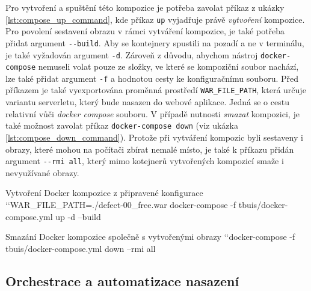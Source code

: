 \documentclass[czech, ma, kiv, he, iso690alph, pdf, viewonly]{fasthesis}
\begin{document}
    Pro vytvoření a spuštění této kompozice je potřeba zavolat příkaz z ukázky \ref{lst:compose_up_command}, kde příkaz \verb|up| vyjadřuje právě \textit{vytvoření} kompozice. Pro povolení sestavení obrazu v rámci vytváření kompozice, je také potřeba přidat argument \verb|--build|. Aby se kontejnery spustili na pozadí a ne v terminálu, je také vyžadován argument \verb|-d|. Zároveň z důvodu, abychom nástroj \verb|docker-compose| nemuseli volat pouze ze složky, ve které se kompoziční soubor nachází, lze také přidat argument \verb|-f| a hodnotou cesty ke konfiguračnímu souboru. Před příkazem je také vyexportována proměnná prostředí \verb|WAR_FILE_PATH|, která určuje variantu serverletu, který bude nasazen do webové aplikace. Jedná se o cestu relativní vůči \textit{docker compose} souboru. V případě nutnosti \textit{smazat} kompozici, je také možnost zavolat příkaz \verb|docker-compose down| (viz ukázka \ref{lst:compose_down_command}). Protože při vytváření kompozic byli sestaveny i obrazy, které mohou na počítači zbírat nemalé místo, je také k příkazu přidán argument \verb|--rmi all|, který mimo kotejnerů vytvořených kompozicí smaže i nevyužívané obrazy.

    \begin{console}{Vytvoření Docker kompozice z připravené konfigurace \label{lst:compose_up_command}}
`\uxprompt`WAR_FILE_PATH=./defect-00_free.war docker-compose -f tbuis/docker-compose.yml up -d --build
    \end{console}

    \begin{console}{Smazání Docker kompozice společně s vytvořenými obrazy \label{lst:compose_down_command}}
`\uxprompt`docker-compose -f tbuis/docker-compose.yml down --rmi all
    \end{console}

    \subsection{Orchestrace a automatizace nasazení} \label{sec:orchestration}
\end{document}
